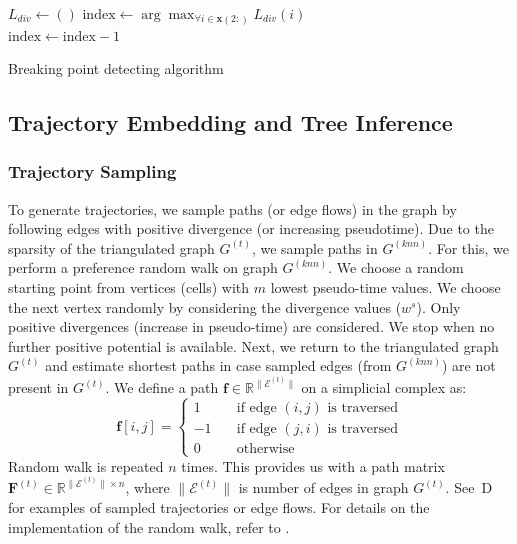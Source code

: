 \begin{algorithm}
    $L_{div} \gets ()$ 
    $\text{index} \gets \arg\max_{\forall i \in \textbf{x}(2:)} L_{div}(i)$\\
    $\text{index} \gets \text{index}-1$ 

    \caption{Breaking point detecting algorithm}
    \label{alg:breaking_point}
\end{algorithm}

\subsection{Trajectory Embedding and Tree Inference}

\subsubsection{Trajectory Sampling}

To generate trajectories, we sample paths (or edge flows) in the graph by following edges with positive divergence (or increasing pseudotime).  Due to the sparsity of the triangulated graph $G^{(t)}$, we sample paths in $G^{(knn)}$. For this, we perform a preference random walk on graph $G^{(knn)}$. We choose a random starting point from vertices (cells) with $m$ lowest pseudo-time values. We choose the next vertex randomly by considering the divergence values ($w^s$). Only positive divergences (increase in pseudo-time) are considered. We stop when no further positive potential is available. Next, we return to the triangulated graph $G^{(t)}$ and estimate shortest paths in case sampled edges (from $G^{(knn)}$) are not present in $G^{(t)}$. We define a path $\mathbf{f}\in\mathbb{R}^{\|\mathcal{E}^{(t)}\|}$ on a simplicial complex as:
\begin{equation}
    \mathbf{f}[i,j] = \begin{cases}
        1\quad & \text{if edge }(i,j) \text{ is traversed}\\
        -1\quad & \text{if edge }(j,i) \text{ is traversed}\\
        0 \quad & \text{otherwise}
    \end{cases}
\label{eq:edgeflow}
\end{equation}
Random walk is repeated $n$ times. This provides us with a path matrix $\mathbf{F}^{(t)}\in \mathbb{R}^{\|\mathcal{E}^{(t)}\| \times n}$, where $\|\mathcal{E}^{(t)}\|$ is number of edges in graph $G^{(t)}$. See~D for examples of sampled trajectories or edge flows. For details on the implementation of the random walk, refer to . 

